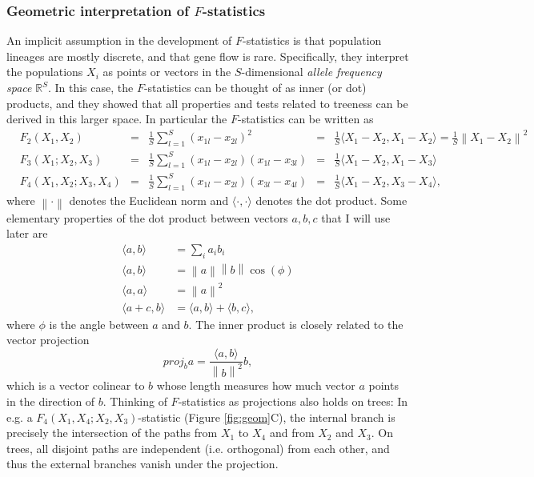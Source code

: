 \documentclass[12pt,fullpage, a4paper]{article}
\newcommand{\norm}[1]{\left\lVert#1\right\rVert}
\newcommand{\normsq}[1]{\left\lVert#1\right\rVert^2}
\newcommand{\vectorproj}[2][]{\textit{proj}_{#1}#2}
\begin{document}
\subsubsection{Geometric interpretation of $F$-statistics}
An implicit assumption in the development of $F$-statistics is that population lineages are mostly discrete, and that gene flow is rare. Specifically, they interpret the populations $X_i$ as points or vectors in the $S$-dimensional \emph{allele frequency space} $\mathbb{R}^S$. In this case, the $F$-statistics can be thought of as inner (or dot) products, and they showed that all properties and tests related to treeness can be derived in this larger space. In particular the $F$-statistics can be written as
\begin{subequations}
	\begin{align}
	&F_2(X_1, X_2) &=& \frac{1}{S}\sum_{l=1}^S(x_{1l} - x_{2l})^2
	&=& \frac{1}{S}\langle X_1 - X_2, X_1 - X_2 \rangle = \frac{1}{S}\normsq{X_1-  X_2}\\
	&F_3(X_1; X_2, X_3) &=& \frac{1}{S}\sum_{l=1}^S(x_{1l} - x_{2l})(x_{1l} - x_{3l}) &=& \frac{1}{S}\langle X_1 - X_2, X_1 - X_3 \rangle\\	
	&F_4(X_1, X_2; X_3, X_4) &=& \frac{1}{S}\sum_{l=1}^S(x_{1l} - x_{2l})(x_{3l} - x_{4l}) &=& \frac{1}{S}\langle X_1 - X_2, X_3 - X_4 \rangle	\text{,}
	\end{align}
\end{subequations}
where $\norm{\cdot}$ denotes the Euclidean norm and $\langle \cdot, \cdot \rangle$ denotes the dot product. Some elementary properties of the dot product between vectors $a, b, c$ that I will use later are
\begin{subequations}
	\begin{align}
	\langle a, b \rangle &= \sum_i a_ib_i\\
	\langle a, b \rangle &= \norm{a}\norm{b}\cos(\phi)\\
	\langle a, a \rangle &= \normsq{a}\\
	\langle a + c, b \rangle &= \langle a, b \rangle + \langle b, c \rangle,
	\end{align}
\end{subequations}
where $\phi$ is the angle between $a$ and $b$. The inner product is  closely related to the vector projection
\begin{equation}
\vectorproj[b]{a} = \frac{\langle a , b\rangle}{\normsq{b}} b,\label{eq:proj}
\end{equation}
which is a vector colinear to $b$ whose length measures how much vector $a$ points in the direction of $b$. Thinking of $F$-statistics as projections also holds on trees: In e.g. a $F_4(X_1, X_4; X_2, X_3)$-statistic (Figure \ref{fig:geom}C), the internal branch is precisely the intersection of the paths from $X_1$ to $X_4$ and from $X_2$ and $X_3$. On trees, all disjoint paths are independent (i.e. orthogonal) from each other, and thus the external branches vanish under the projection.
\end{document}
